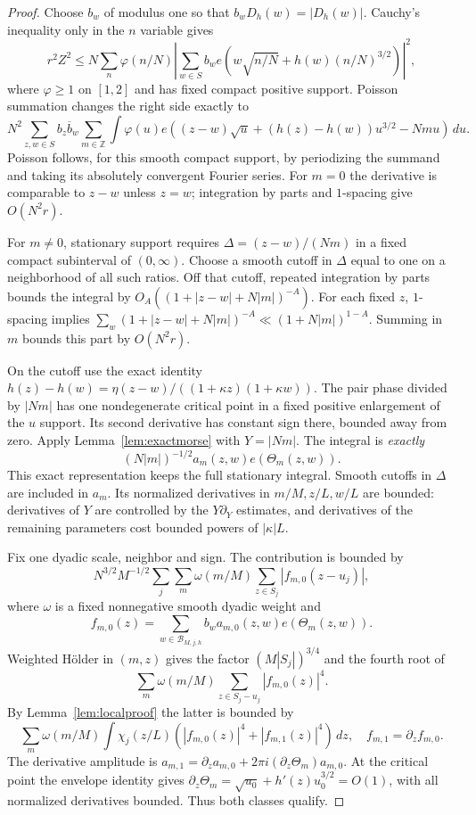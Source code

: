 \begin{proof}
Choose $b_w$ of modulus one so that $b_wD_h(w)=|D_h(w)|$.
Cauchy's inequality only in the $n$ variable gives
\[
 r^2Z^2\le N\sum_n\varphi(n/N)
 \left|\sum_{w\in S}b_w
 e(w\sqrt{n/N}+h(w)(n/N)^{3/2})\right|^2,
\]
where $\varphi\ge1$ on $[1,2]$ and has fixed compact positive support.
Poisson summation changes the right side exactly to
\[
 N^2\sum_{z,w\in S}b_z\overline b_w\sum_{m\in\mathbb Z}
 \int\varphi(u)e((z-w)\sqrt u+(h(z)-h(w))u^{3/2}-Nm u)\,du.
\]
Poisson follows, for this smooth compact support, by periodizing the
summand and taking its absolutely convergent Fourier series.
For $m=0$ the derivative is comparable to $z-w$ unless $z=w$;
integration by parts and $1$-spacing give $O(N^2r)$.

For $m\ne0$, stationary support requires $\Delta=(z-w)/(Nm)$ in a
fixed compact subinterval of $(0,\infty)$. Choose a smooth cutoff in
$\Delta$ equal to one on a neighborhood of all such ratios. Off that
cutoff, repeated integration by parts bounds the integral by
$O_A((1+|z-w|+N|m|)^{-A})$.
For each fixed $z$, $1$-spacing implies
$\sum_w(1+|z-w|+N|m|)^{-A}\ll(1+N|m|)^{1-A}$.
Summing in $m$ bounds this part by $O(N^2r)$.

On the cutoff use the exact identity
$h(z)-h(w)=\eta(z-w)/((1+\kappa z)(1+\kappa w))$.
The pair phase divided by $|Nm|$ has one nondegenerate critical point
in a fixed positive enlargement of the $u$ support. Its second
derivative has constant sign there, bounded away from zero. Apply
Lemma~\ref{lem:exactmorse} with $Y=|Nm|$.
The integral is \emph{exactly}
\[
 (N|m|)^{-1/2}a_m(z,w)e(\Theta_m(z,w)).
\]
This exact representation keeps the full stationary integral. Smooth cutoffs in
$\Delta$ are included in $a_m$. Its normalized derivatives in
$m/M,z/L,w/L$ are bounded: derivatives of $Y$ are controlled by the
$Y\partial_Y$ estimates, and derivatives of the remaining parameters
cost bounded powers of $|\kappa|L$.

Fix one dyadic scale, neighbor and sign. The contribution is bounded by
\[
 N^{3/2}M^{-1/2}
 \sum_j\sum_m\omega(m/M)\sum_{z\in S_j}|f_{m,0}(z-u_j)|,
\]
where $\omega$ is a fixed nonnegative smooth dyadic weight and
\[
 f_{m,0}(z)=\sum_{w\in\mathcal B_{M,j,h}}b_w a_{m,0}(z,w)e(\Theta_m(z,w)).
\]
Weighted H\"older in $(m,z)$ gives the factor
$(M|S_j|)^{3/4}$ and the fourth root of
\[
\sum_m\omega(m/M)\sum_{z\in S_j-u_j}|f_{m,0}(z)|^4.
\]
By Lemma~\ref{lem:localproof} the latter is bounded by
\[
 \sum_m\omega(m/M)\int\chi_j(z/L)
 (|f_{m,0}(z)|^4+|f_{m,1}(z)|^4)\,dz,
 \quad f_{m,1}=\partial_zf_{m,0}.
\]
The derivative amplitude is
$a_{m,1}=\partial_z a_{m,0}+2\pi i(\partial_z\Theta_m)a_{m,0}$.
At the critical point the envelope identity gives
$\partial_z\Theta_m=\sqrt{u_0}+h'(z)u_0^{3/2}=O(1)$,
with all normalized derivatives bounded. Thus both classes qualify.


\end{proof}
